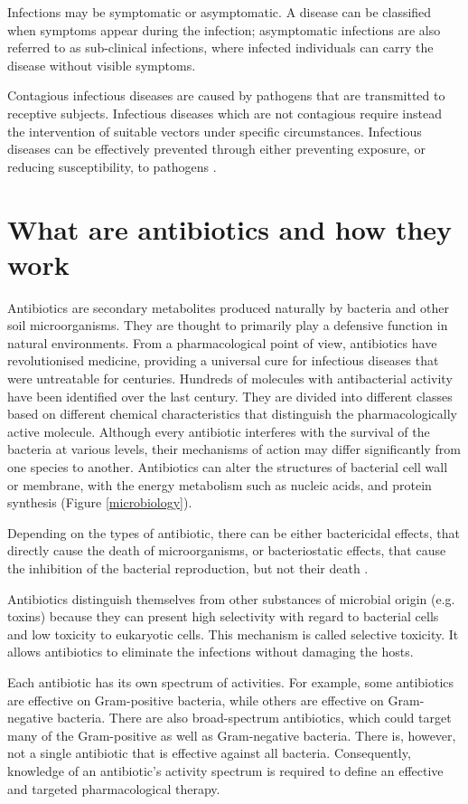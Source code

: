 \documentclass[11pt]{report}
\begin{document}
Infections may be symptomatic or asymptomatic.
A disease can be classified when symptoms appear during the infection; asymptomatic infections are also referred to as sub-clinical infections, where infected individuals can carry the disease without visible symptoms.

Contagious infectious diseases are caused by pathogens that are transmitted to receptive subjects.
Infectious diseases which are not contagious require instead the intervention of suitable vectors under specific circumstances.
Infectious diseases can be effectively prevented through either preventing exposure, or reducing susceptibility, to pathogens \cite{epicentro2014}.

\chapter{What are antibiotics and how they work}
Antibiotics are secondary metabolites produced naturally by bacteria and other soil microorganisms.
They are thought to primarily play a defensive function in natural environments.
From a pharmacological point of view, antibiotics have revolutionised medicine, providing a universal cure for infectious diseases that were untreatable for centuries.
Hundreds of molecules with antibacterial activity have been identified over the last century.
They are divided into different classes based on different chemical characteristics that distinguish the pharmacologically active molecule.
Although every antibiotic interferes with the survival of the bacteria at various levels, their mechanisms of action may differ significantly from one species to another.
Antibiotics can alter the structures of bacterial cell wall or membrane, with the energy metabolism such as nucleic acids, and protein synthesis (Figure \ref{microbiology}).

Depending on the types of antibiotic, there can be either bactericidal effects, that directly cause the death of microorganisms, or bacteriostatic effects, that cause the inhibition of the bacterial reproduction, but not their death \cite{leekha2011}.

Antibiotics distinguish themselves from other substances of microbial origin (e.g. toxins) because they can present high selectivity with regard to bacterial cells and low toxicity to eukaryotic cells.
This mechanism is called selective toxicity.
It allows antibiotics to eliminate the infections without damaging the hosts.

Each antibiotic has its own spectrum of activities.
For example, some antibiotics are effective on Gram-positive bacteria, while others are effective on Gram-negative bacteria.
There are also broad-spectrum antibiotics, which could target many of the Gram-positive as well as Gram-negative bacteria.
There is, however, not a single antibiotic that is effective against all bacteria.
Consequently, knowledge of an antibiotic’s activity spectrum is required to define an effective and targeted pharmacological therapy.
\end{document}
